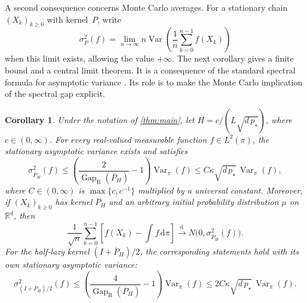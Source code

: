 \documentclass[11pt]{article}
\newtheorem{corollary}[corollary]{Corollary}
\newcommand{\R}{\mathbb R}
\newcommand{\Var}{\operatorname{Var}}
\newcommand{\Gap}{\operatorname{Gap}_{\mathrm{R}}}
\newcommand{\1}{\mathbf 1}
\newcommand{\df}{\mathrm{d}}
\begin{document}
	
	A second consequence concerns Monte Carlo averages. For a stationary
	chain $(X_k)_{k\geq0}$ with kernel~$P$, write
	\[
	\sigma_P^2(f)=\lim_{n\to\infty}
	n\Var\left(\frac1n\sum_{k=0}^{n-1}f(X_k)\right)
	\]
	when this limit exists, allowing the value $+\infty$.
	The next corollary gives a finite bound and a central limit theorem.
	It is a consequence of the
	standard spectral formula for asymptotic variance
	\citep{KipnisVaradhan1986,Paulin2015}. Its role is to make the
	Monte Carlo implication of the spectral gap explicit.
	
	
	\begin{corollary}\label{cor:asymptotic-variance}
		Under the notation of \cref{thm:main}, let
		$H=c/(L\sqrt{d\,p_\star})$, where $c \in (0,\infty)$.
		For every real-valued measurable function $f\in L^2(\pi)$,
		the stationary asymptotic variance exists and satisfies
		\begin{equation}\label{eq:asymptotic-variance}
			\sigma_{\overline P_H}^2(f)
			\leq\left(\frac{2}{\Gap(\overline P_H)}-1\right)
			\Var_\pi(f)
			\leq C\kappa\sqrt{d\,p_\star}\,\Var_\pi(f),
		\end{equation}
		where $C\in(0,\infty)$ is $\max\{c,c^{-1}\}$ multiplied by a universal constant.
		Moreover, if $(X_k)_{k\geq0}$ has kernel $\overline P_H$ and
		an arbitrary initial probability distribution $\mu$ on $\R^d$, then
		\[
		\frac1{\sqrt n}\sum_{k=0}^{n-1}
		\left[f(X_k)-\int f\,\df\pi\right]
		\xrightarrow{\mathrm d}
		N\bigl(0,\sigma_{\overline P_H}^2(f)\bigr).
		\]
		For the half-lazy kernel $(I+\overline P_H)/2$, the corresponding
		statements hold with its own stationary asymptotic variance:
		\[
		\sigma_{(I+\overline P_H)/2}^2(f)
		\leq\left(\frac{4}{\Gap(\overline P_H)}-1\right)
		\Var_\pi(f)
		\leq 2C\kappa\sqrt{d\,p_\star}\,\Var_\pi(f).
		\]
	\end{corollary}
	
\end{document}
